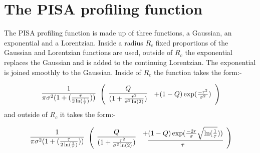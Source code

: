 \section{The PISA profiling function}
\label{funcparms}
The PISA profiling function is made up of three functions, a Gaussian, an
exponential and a Lorentzian. Inside a radius $R_{c}$ fixed proportions of 
the Gaussian and Lorentzian functions are used, outside of $R_{c}$ the 
exponential replaces the Gaussian and is added to the continuing
Lorentzian. The exponential is joined smoothly to the Gaussian. Inside of
$R_{c}$ the function takes the form:-

\large
\begin{displaymath}
\begin{array}{c}
 1\\
 \overline{\pi\sigma^{2}(1+(\frac{\tau}{2\ln(\frac{1}{\tau})}))}
\end{array}
    \left( \begin{array}{c} Q \\
    \overline{(1+\frac{r^{2}}{\sigma^{2}\ln(2)} )}\\
    \end{array}
      \begin{array}[b]{c}
         + (1-Q)\exp(\frac{-r^{2}}{\sigma^{2}})\\
      \end{array} \right) \\
\end{displaymath}
\normalsize
and outside of $R_{c}$ it takes the form:-

\large
\begin{displaymath}
\begin{array}{c}
 1\\
 \overline{\pi\sigma^{2}(1+(\frac{\tau}{2\ln(\frac{1}{\tau})}))}
\end{array}
    \left( \begin{array}{c} Q \\
    \overline{(1+\frac{r^{2}}{\sigma^{2}\ln(2)} )}\\
    \end{array}
      \begin{array}{cc}
         +\underline{(1-Q)\exp(\frac{-2r}{\sigma}\sqrt{\ln(\frac{1}{\tau}}))}\\
          \tau\\
      \end{array} \right) \\
\end{displaymath}
\normalsize

